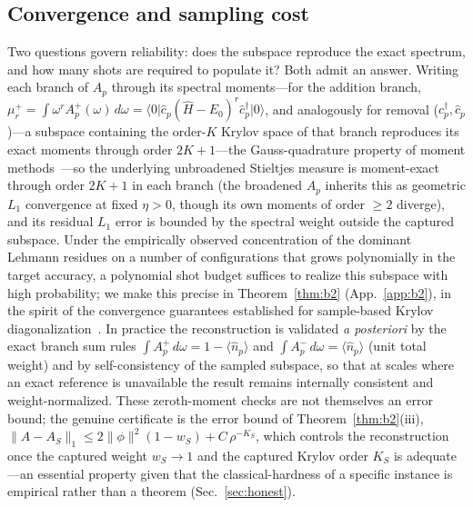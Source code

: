 \subsection{Convergence and sampling cost}
Two questions govern reliability: does the subspace reproduce the exact spectrum, and how many shots
are required to populate it? Both admit an answer. Writing each branch of $A_p$ through its spectral moments---for the addition branch,
$\mu_r^{+}=\int \omega^r A_p^{+}(\omega)\,d\omega=\langle 0\lvert \hat c_p (\hat H-E_0)^r \hat
c^\dagger_p\rvert 0\rangle$, and analogously for removal ($\hat c^\dagger_p,\hat c_p$)---a subspace
containing the order-$K$ Krylov space of that branch reproduces its exact
moments through order $2K{+}1$---the Gauss-quadrature property of moment
methods~\cite{golub2010}---so the underlying unbroadened Stieltjes measure is moment-exact through order
$2K{+}1$ in each branch (the broadened $A_p$ inherits this as geometric $L_1$ convergence at fixed
$\eta>0$, though its own moments of order ${\ge}2$ diverge), and its
residual $L_1$ error is bounded by the spectral weight outside the captured subspace. Under the empirically observed concentration of the
dominant Lehmann residues on a number of configurations that grows polynomially in the target accuracy,
a polynomial shot budget suffices to realize this subspace with high probability; we make
this precise in Theorem~\ref{thm:b2} (App.~\ref{app:b2}), in the spirit of the convergence guarantees
established for sample-based Krylov diagonalization~\cite{skqd2025,kirby2023,yoshioka2025,piccinelli2025}. In
practice the reconstruction is validated \emph{a posteriori} by the exact branch sum rules
$\int A_p^{+}\,d\omega = 1-\langle \hat n_p\rangle$ and $\int A_p^{-}\,d\omega = \langle \hat n_p\rangle$
(unit total weight) and by self-consistency of the sampled subspace, so that at scales where an
exact reference is unavailable the result remains internally consistent and weight-normalized. These
zeroth-moment checks are not themselves an error bound; the genuine certificate is the error
bound of Theorem~\ref{thm:b2}(iii), $\lVert A-A_S\rVert_1\le 2\lVert\phi\rVert^2(1-w_S)+C\,\rho^{-K_S}$,
which controls the reconstruction once the captured weight $w_S\to1$ and the captured Krylov order
$K_S$ is adequate---an essential property given that the
classical-hardness of a specific instance is empirical rather than a theorem
(Sec.~\ref{sec:honest}).
